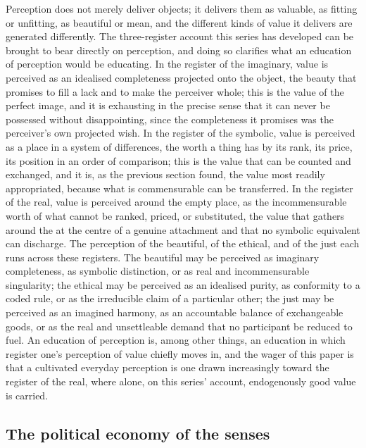 Perception does not merely deliver objects; it delivers them as valuable, as fitting or unfitting, as beautiful or mean, and the different kinds of value it delivers are generated differently. The three-register account this series has developed can be brought to bear directly on perception, and doing so clarifies what an education of perception would be educating. In the register of the imaginary, value is perceived as an idealised completeness projected onto the object, the beauty that promises to fill a lack and to make the perceiver whole; this is the value of the perfect image, and it is exhausting in the precise sense that it can never be possessed without disappointing, since the completeness it promises was the perceiver's own projected wish. In the register of the symbolic, value is perceived as a place in a system of differences, the worth a thing has by its rank, its price, its position in an order of comparison; this is the value that can be counted and exchanged, and it is, as the previous section found, the value most readily appropriated, because what is commensurable can be transferred. In the register of the real, value is perceived around the empty place, as the incommensurable worth of what cannot be ranked, priced, or substituted, the value that gathers around the  at the centre of a genuine attachment and that no symbolic equivalent can discharge. The perception of the beautiful, of the ethical, and of the just each runs across these registers. The beautiful may be perceived as imaginary completeness, as symbolic distinction, or as real and incommensurable singularity; the ethical may be perceived as an idealised purity, as conformity to a coded rule, or as the irreducible claim of a particular other; the just may be perceived as an imagined harmony, as an accountable balance of exchangeable goods, or as the real and unsettleable demand that no participant be reduced to fuel. An education of perception is, among other things, an education in which register one's perception of value chiefly moves in, and the wager of this paper is that a cultivated everyday perception is one drawn increasingly toward the register of the real, where alone, on this series' account, endogenously good value is carried.

\subsection{The political economy of the senses}
\label{p23:sub:val-politicaleconomy}

